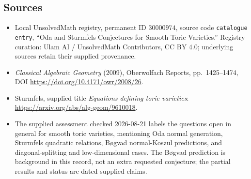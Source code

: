 \documentclass[11pt]{article}
\begin{document}
\subsection{Sources}
\begin{itemize}
\item Local UnsolvedMath registry, permanent ID \(30000974\), source code \texttt{catalogue entry}, ``Oda and Sturmfels Conjectures for Smooth Toric Varieties.'' Registry curation: Ulam AI / UnsolvedMath Contributors, CC BY 4.0; underlying sources retain their supplied provenance.
\item \emph{Classical Algebraic Geometry} (2009), Oberwolfach Reports, pp.\ 1425--1474, DOI \url{https://doi.org/10.4171/owr/2008/26}.
\item Sturmfels, supplied title \emph{Equations defining toric varieties}: \url{https://arxiv.org/abs/alg-geom/9610018}.
\item The supplied assessment checked 2026-08-21 labels the questions open in general for smooth toric varieties, mentioning Oda normal generation, Sturmfels quadratic relations, Bøgvad normal-Koszul predictions, and diagonal-splitting and low-dimensional cases. The Bøgvad prediction is background in this record, not an extra requested conjecture; the partial results and status are dated supplied claims.
\end{itemize}
\end{document}

